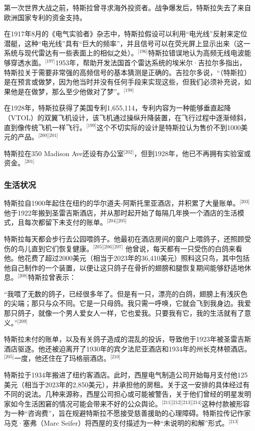 第一次世界大战之前，特斯拉曾寻求海外投资者。战争爆发后，特斯拉失去了来自欧洲国家专利的资金支持。

在1917年8月的《电气实验者》杂志中，特斯拉假设可以利用“电光线”反射来定位潜艇，这种“电光线”具有“巨大的频率”，并且信号可以在荧光屏上显示出来（这一系统与现代雷达有一些表面上的相似之处）。\(^\text{[196]}\)特斯拉错误地认为高频无线电波能够穿透水面。\(^\text{[197]}\)1953年，帮助开发法国首个雷达系统的埃米尔·吉拉尔多指出，特斯拉关于需要非常强的高频信号的基本猜测是正确的。吉拉尔多说，“（特斯拉）是在预言或做梦，因为他当时并没有任何手段来实现这些，但我们必须补充说，如果他是在做梦，那么至少他做对了梦”。\(^\text{[198]}\)

在1928年，特斯拉获得了美国专利1,655,114，专利内容为一种能够垂直起降（VTOL）的双翼飞机设计，该飞机通过操纵升降装置，在飞行过程中逐渐倾斜，直到像传统飞机一样飞行。\(^\text{[199]}\)这个不切实际的设计是特斯拉认为售价不到1000美元的产品。\(^\text{[200][201]}\)

特斯拉在350 Madison Ave还设有办公室\(^\text{[202]}\)，但到1928年，他已不再拥有实验室或资金。\(^\text{[201]}\)
\subsubsection{生活状况}  
特斯拉自1900年起住在纽约的华尔道夫-阿斯托里亚酒店，并积累了大量账单。\(^\text{[203]}\)他于1922年搬到圣雷吉斯酒店，并从那时起开始了每隔几年换一个酒店的生活模式，且每次都留下未支付的账单。\(^\text{[204][205] }\) 

特斯拉每天都会步行去公园喂鸽子。他最初在酒店房间的窗户上喂鸽子，还照顾受伤的鸟儿直到它们恢复健康。\(^\text{[205][206][207]}\) 他曾说，每天都有一只受伤的白鸽来看他。他花费了超过2000美元（相当于2023年的36,410美元）照料这只鸟，其中包括他自己制作的一个装置，以便让这只鸽子在骨折的翅膀和腿恢复期间能够舒适地休息。\(^\text{[208]}\)特斯拉曾表示：

“我喂了无数的鸽子，已经很多年了。但是有一只，漂亮的白鸽，翅膀上有浅灰色的尖端；那只与众不同。它是一只母鸽。我只需一呼唤，它就会飞到我身边。我爱那只鸽子，就像一个男人爱女人一样，它也爱我。只要我有它，我的生活就有了意义。”\(^\text{[209]}\)

特斯拉未付的账单，以及有关鸽子造成的混乱的投诉，导致他于1923年被圣雷吉斯酒店驱逐。他还被迫离开了1930年的宾夕法尼亚酒店和1934年的州长克林顿酒店。\(^\text{[205]}\)一度，他还住在了玛格丽酒店。\(^\text{[210]}\)

特斯拉于1934年搬进了纽约客酒店。此时，西屋电气制造公司开始每月支付他125美元（相当于2023年的2,850美元），并承担他的房租。关于这一安排的具体经过有不同的说法。几种来源称，西屋公司担心或可能被警告，关于他们曾经的明星发明家如今生活困窘的情况可能会带来不好的公众舆论。\(^\text{[211][212][213][214]}\)这种付款被形容为一种“咨询费”，旨在规避特斯拉不愿接受慈善援助的心理障碍。特斯拉传记作家马克·塞弗（Marc Seifer）将西屋的支付描述为一种“未说明的和解”形式。\(^\text{[213]}\)
